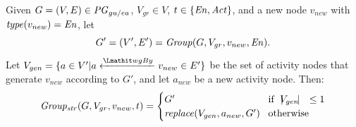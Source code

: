 

\begin{definition}
Given 
$G=(V,E) \in \mathit{PG}_{gu/ea}$, $V_{gr} \in V$, $t \in \{\mathit{En}, \mathit{Act}\}$, and a new node $v_{new}$ with $\mathit{type}(v_{new}) = \mathit{En}$, let
\[ G' = (V',E') = \mathit{Group}(G, V_{gr}, v_{new}, \mathit{En}). \]
Let 
$V_{gen} = \{ a \in V' |  a \xleftarrow{\wgby} v_{new} \in E' \}$ be the set of activity nodes that generate $v_{new}$ according to $G'$, and let $a_{new}$ be a new activity node. Then:
\begin{equation*}
\mathit{Group_{str}}(G, V_{gr},v_{new}, t)=
\begin{cases}
G' & \!\text{if}~~ |\!\!V_{gen}\!| ~~\leq 1  \\
\mathit{replace}(V_{gen}, a_{new}, G') & \!\text{otherwise } 
\end{cases}
\end{equation*}
\label{def:strict-t-grouping}
\end{definition}
%


